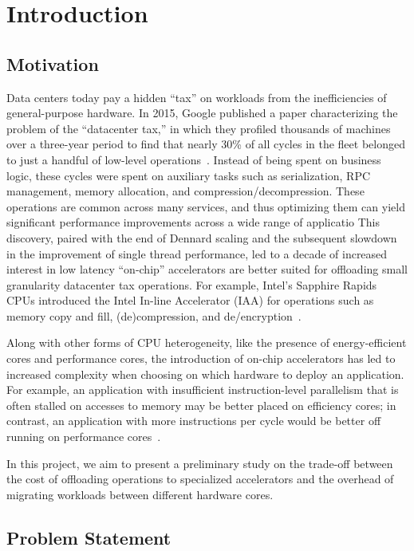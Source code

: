 \section{Introduction}

\subsection{Motivation}

Data centers today pay a hidden ``tax'' on workloads from the inefficiencies of general-purpose hardware.
In 2015, Google published a paper characterizing the problem of the ``datacenter tax,'' in which they profiled thousands of machines over a three-year period to find that nearly 30\% of all cycles in the fleet belonged to just a handful of low-level operations~\cite{kanev2015profiling}.
Instead of being spent on business logic, these cycles were spent on auxiliary tasks such as serialization, RPC management, memory allocation, and compression/decompression.
These operations are common across many services, and thus optimizing them can yield significant performance improvements across a wide range of applicatio
This discovery, paired with the end of Dennard scaling and the subsequent slowdown in the improvement of single thread performance, led to a decade of increased interest in low latency ``on-chip'' accelerators are better suited for offloading small granularity datacenter tax operations.
For example, Intel's Sapphire Rapids CPUs introduced the Intel In-line Accelerator (IAA) for operations such as memory copy and fill, (de)compression, and de/encryption~\cite{yuan2024intel}.

Along with other forms of CPU heterogeneity, like the presence of energy-efficient cores and performance cores, the introduction of on-chip accelerators has led to increased complexity when choosing on which hardware to deploy an application.
For example, an application with insufficient instruction-level parallelism that is often stalled on accesses to memory may be better placed on efficiency cores; in contrast, an application with more instructions per cycle would be better off running on performance cores~\cite{kanev2015profiling}.

In this project, we aim to present a preliminary study on the trade-off between the cost of offloading operations to specialized accelerators and the overhead of migrating workloads between different hardware cores.

\subsection{Problem Statement}

